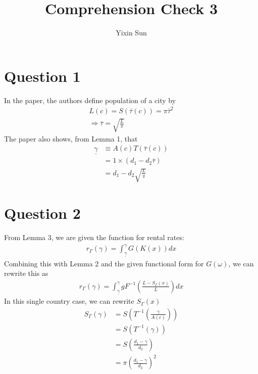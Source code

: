 \documentclass{article}
\title{Comprehension Check 3}
\author{Yixin Sun}
\begin{document}
\maketitle

\section*{Question 1}
In the paper, the authors define population of a city by
\begin{gather*}
    L(c)=S(\bar{\tau}(c)) = \pi\bar{\tau}^2\\
    \Rightarrow \bar{\tau} = \sqrt{\frac{L}{\pi}}
\end{gather*}
The paper also shows, from Lemma 1, that 
\begin{align*}
    \underline{\gamma} &\equiv A(c) T(\bar{\tau}(c)) \\
    &= 1 \times (d_1 - d_2\bar{\tau}) \\
    &= d_1 - d_2\sqrt{\frac{L}{\pi}}
\end{align*}

\section*{Question 2}
From Lemma 3, we are given the function for rental rates:
\begin{align*}
    r_{\Gamma}(\gamma)=  \int_{\underline{\gamma}}^{\gamma} G(K(x)) d x
\end{align*}
Combining this with Lemma 2 and the given functional form for $G(\omega)$, we can rewrite this as 
\begin{align*}
    r_{\Gamma}(\gamma) = \int_{\underline{\gamma}}^{\gamma}  gF^{-1}\left(\frac{L-S_{\Gamma}(x)}{L}\right) dx
\end{align*}
In this single country case, we can rewrite $S_\Gamma(x)$ 
\begin{align*}
    S_\Gamma(\gamma) &= S\left(T^{-1}\left(\frac{\gamma}{A(c)}\right)\right) \\
    &= S(T^{-1}(\gamma)) \\
    &= S\left(\frac{d_1 - \gamma}{d_2}\right) \\
    &= \pi\left(\frac{d_1 - \gamma}{d_2}\right)^2
\end{align*}
\end{document}
